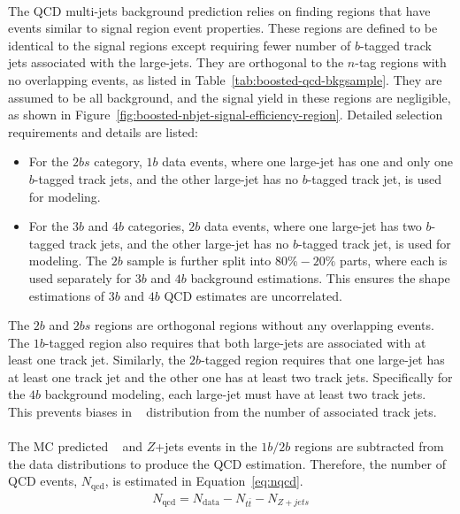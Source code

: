 \paragraph{}
The QCD multi-jets background prediction relies on finding regions that have events similar to signal region event properties.
These regions are defined to be identical to the signal regions except requiring fewer number of $b$-tagged track jets associated with the large-\R jets.
They are orthogonal to the $n$-tag regions with no overlapping events, as listed in Table~\ref{tab:boosted-qcd-bkgsample}.
They are assumed to be all background, and the signal yield in these regions are negligible, as shown in Figure~\ref{fig:boosted-nbjet-signal-efficiency-region}.
Detailed selection requirements and details are listed:
\begin{itemize}
  \item For the $2bs$ category, $1b$ data events, where one large-\R jet has one and only one $b$-tagged track jets, and the other large-\R jet has no $b$-tagged track jet, is used for modeling.
  \item For the $3b$ and $4b$ categories, $2b$ data events, where one large-\R jet has two $b$-tagged track jets, and the other large-\R jet has no $b$-tagged track jet, is used for modeling. The $2b$ sample is further split into $80\%-20\%$ parts, where each is used separately for $3b$ and $4b$ background estimations. This ensures the shape estimations of $3b$ and $4b$ QCD estimates are uncorrelated. 
\end{itemize}
The $2b$ and $2bs$ regions are orthogonal regions without any overlapping events.
The $1b$-tagged region also requires that both large-\R jets are associated with at least one track jet. 
Similarly, the $2b$-tagged region requires that one large-\R jet has at least one track jet and the other one has at least two track jets.  
Specifically for the $4b$ background modeling, each large-\R jet must have at least two track jets. 
This prevents biases in \mtwoJ~ distribution from the number of associated track jets.

\paragraph{}
The MC predicted \ttbar~ and $Z$+jets events in the $1b/2b$ regions are subtracted from the data distributions to produce the QCD estimation. 
Therefore, the number of QCD events, $N_{\text{qcd}}$, is estimated in Equation~\ref{eq:nqcd}.
\begin{eqnarray}
\label{eq:nqcd}
N_{\text{qcd}} = N_{\text{data}} - N_{t\bar{t}} - N_{Z+jets} 
\end{eqnarray}

